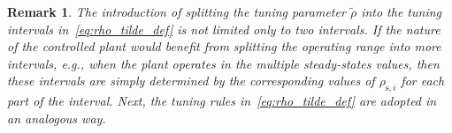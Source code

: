 \documentclass[preprint,12pt]{elsarticle}
\newtheorem{remark}[theorem]{Remark}
\newtheorem{definition}{Definition}[section]
\begin{document}
	
	\begin{remark}
		\label{rem:rho_tilde}		
		The introduction of splitting the tuning parameter $\widetilde{\rho}$ into the tuning intervals in~\eqref{eq:rho_tilde_def} is not limited only to two intervals. If the nature of the controlled plant would benefit from splitting the operating range into more intervals, e.g., when the plant operates in the multiple steady-states values, then these intervals are simply determined by the corresponding values of $\rho_{\mathrm{s}, i}$ for each part of the interval. Next, the tuning rules in~\eqref{eq:rho_tilde_def} are adopted in an analogous way.
	\end{remark}
	
\end{document}
